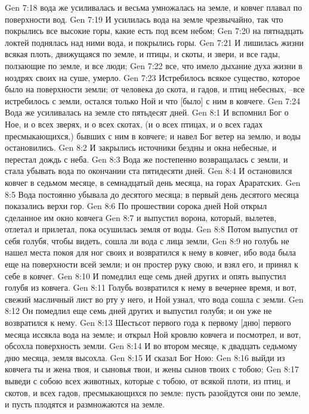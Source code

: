 Gen 7:18  вода же усиливалась и весьма умножалась на земле, и ковчег плавал по поверхности вод.
Gen 7:19  И усилилась вода на земле чрезвычайно, так что покрылись все высокие горы, какие есть под всем небом;
Gen 7:20  на пятнадцать локтей поднялась над ними вода, и покрылись горы.
Gen 7:21  И лишилась жизни всякая плоть, движущаяся по земле, и птицы, и скоты, и звери, и все гады, ползающие по земле, и все люди;
Gen 7:22  все, что имело дыхание духа жизни в ноздрях своих на суше, умерло.
Gen 7:23  Истребилось всякое существо, которое было на поверхности земли; от человека до скота, и гадов, и птиц небесных, --все истребилось с земли, остался только Ной и что [было] с ним в ковчеге.
Gen 7:24  Вода же усиливалась на земле сто пятьдесят дней.
Gen 8:1  И вспомнил Бог о Ное, и о всех зверях, и о всех скотах, (и о всех птицах, и о всех гадах пресмыкающихся,) бывших с ним в ковчеге; и навел Бог ветер на землю, и воды остановились.
Gen 8:2  И закрылись источники бездны и окна небесные, и перестал дождь с неба.
Gen 8:3  Вода же постепенно возвращалась с земли, и стала убывать вода по окончании ста пятидесяти дней.
Gen 8:4  И остановился ковчег в седьмом месяце, в семнадцатый день месяца, на горах Араратских.
Gen 8:5  Вода постоянно убывала до десятого месяца; в первый день десятого месяца показались верхи гор.
Gen 8:6  По прошествии сорока дней Ной открыл сделанное им окно ковчега
Gen 8:7  и выпустил ворона, который, вылетев, отлетал и прилетал, пока осушилась земля от воды.
Gen 8:8  Потом выпустил от себя голубя, чтобы видеть, сошла ли вода с лица земли,
Gen 8:9  но голубь не нашел места покоя для ног своих и возвратился к нему в ковчег, ибо вода была еще на поверхности всей земли; и он простер руку свою, и взял его, и принял к себе в ковчег.
Gen 8:10  И помедлил еще семь дней других и опять выпустил голубя из ковчега.
Gen 8:11  Голубь возвратился к нему в вечернее время, и вот, свежий масличный лист во рту у него, и Ной узнал, что вода сошла с земли.
Gen 8:12  Он помедлил еще семь дней других и выпустил голубя; и он уже не возвратился к нему.
Gen 8:13  Шестьсот первого года к первому [дню] первого месяца иссякла вода на земле; и открыл Ной кровлю ковчега и посмотрел, и вот, обсохла поверхность земли.
Gen 8:14  И во втором месяце, к двадцать седьмому дню месяца, земля высохла.
Gen 8:15  И сказал Бог Ною:
Gen 8:16  выйди из ковчега ты и жена твоя, и сыновья твои, и жены сынов твоих с тобою;
Gen 8:17  выведи с собою всех животных, которые с тобою, от всякой плоти, из птиц, и скотов, и всех гадов, пресмыкающихся по земле: пусть разойдутся они по земле, и пусть плодятся и размножаются на земле.
